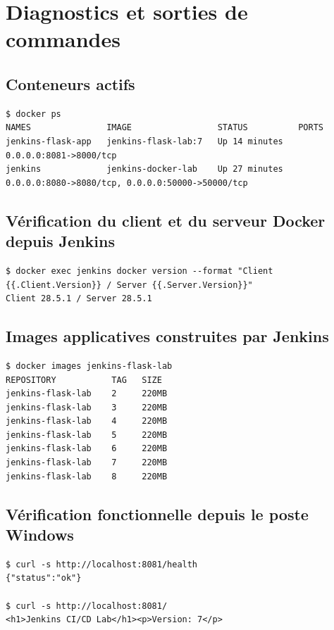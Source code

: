 \documentclass[11pt,a4paper]{article}
\begin{document}
\section{Diagnostics et sorties de commandes}

\subsection{Conteneurs actifs}

\begin{lstlisting}
$ docker ps
NAMES               IMAGE                 STATUS          PORTS
jenkins-flask-app   jenkins-flask-lab:7   Up 14 minutes   0.0.0.0:8081->8000/tcp
jenkins             jenkins-docker-lab    Up 27 minutes   0.0.0.0:8080->8080/tcp, 0.0.0.0:50000->50000/tcp
\end{lstlisting}

\subsection{Vérification du client et du serveur Docker depuis Jenkins}

\begin{lstlisting}
$ docker exec jenkins docker version --format "Client {{.Client.Version}} / Server {{.Server.Version}}"
Client 28.5.1 / Server 28.5.1
\end{lstlisting}

\subsection{Images applicatives construites par Jenkins}

\begin{lstlisting}
$ docker images jenkins-flask-lab
REPOSITORY           TAG   SIZE
jenkins-flask-lab    2     220MB
jenkins-flask-lab    3     220MB
jenkins-flask-lab    4     220MB
jenkins-flask-lab    5     220MB
jenkins-flask-lab    6     220MB
jenkins-flask-lab    7     220MB
jenkins-flask-lab    8     220MB
\end{lstlisting}

\subsection{Vérification fonctionnelle depuis le poste Windows}

\begin{lstlisting}
$ curl -s http://localhost:8081/health
{"status":"ok"}

$ curl -s http://localhost:8081/
<h1>Jenkins CI/CD Lab</h1><p>Version: 7</p>
\end{lstlisting}
\end{document}
